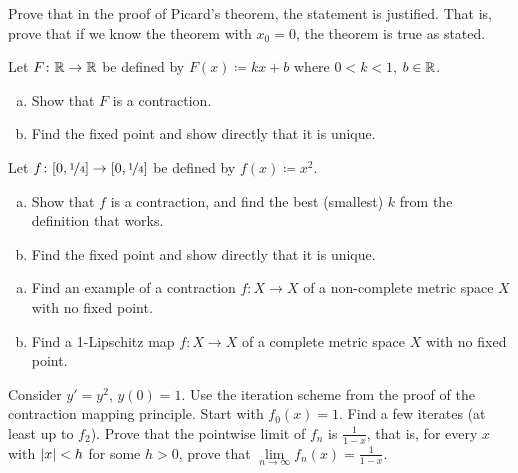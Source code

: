 \begin{exercise}
Prove that in the proof of Picard's theorem,
the statement  is
justified.  That is, prove that if we know the theorem with $x_0 = 0$, the
theorem is true as stated.
\end{exercise}

\begin{exercise}
\pagebreak[2]
Let $F \colon {\mathbb{R}} \to {\mathbb{R}}$ be defined by
$F(x) \coloneqq kx + b$ where $0 < k < 1$, $b \in {\mathbb{R}}$.
\begin{enumerate}[a)]
\item
Show that $F$ is a contraction.
\item
Find the fixed point and show directly that it is unique.
\end{enumerate}
\end{exercise}

\begin{exercise}
\pagebreak[2]
Let $f \colon [0,\nicefrac{1}{4}] \to [0,\nicefrac{1}{4}]$ be defined by
$f(x) \coloneqq x^2$.
\begin{enumerate}[a)]
\item
Show that $f$
is a contraction, and find the best (smallest) $k$ from the definition that works.
\item
Find the fixed point and show directly that it is unique.
\end{enumerate}
\end{exercise}

\begin{samepage}
\begin{exercise} \label{exercise:nofixedpoint}
\leavevmode
\begin{enumerate}[a)]
\item
Find an example of a contraction $f \colon X \to X$
of a non-complete metric space $X$ with no
fixed point.
\item
Find a 1-Lipschitz map $f \colon X \to X$ of a complete metric space $X$ with no fixed point.
\end{enumerate}
\end{exercise}
\end{samepage}

\begin{exercise}
Consider $y' =y^2$, $y(0)=1$.  Use the iteration scheme
from the proof of the contraction mapping principle.
Start with $f_0(x) = 1$.  Find a 
few iterates (at least up to $f_2$).  Prove that
the pointwise limit of $f_n$ is $\frac{1}{1-x}$, that is, for every $x$
with $\left\lvert {x} \right\rvert < h$ for some $h > 0$,
prove that $\lim\limits_{n\to\infty}f_n(x) = \frac{1}{1-x}$.
\end{exercise}

